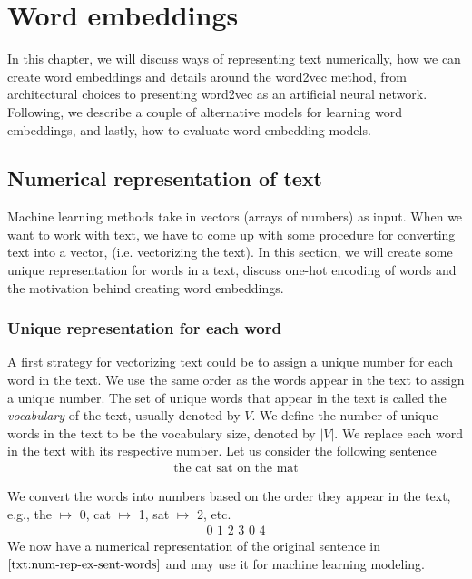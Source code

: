 \chapter{Word embeddings}
In this chapter, we will discuss ways of representing text numerically, how we can create word embeddings and details around the word2vec method, from architectural choices to presenting word2vec as an artificial neural network. Following, we describe a couple of alternative models for learning word embeddings, and lastly, how to evaluate word embedding models.

\section{Numerical representation of text}
Machine learning methods take in vectors (arrays of numbers) as input. When we want to work with text, we have to come up with some procedure for converting text into a vector, (i.e. vectorizing the text).
In this section, we will create some unique representation for words in a text, discuss one-hot encoding of words and the motivation behind creating word embeddings.

\subsection{Unique representation for each word}
\label{unique-representation-for-each-word}
A first strategy for vectorizing text could be to assign a unique number for each word in the text. We use the same order as the words appear in the text to assign a unique number. The set of unique words that appear in the text is called the \textit{vocabulary} of the text, usually denoted by $V$. We define the number of unique words in the text to be the vocabulary size, denoted by $|V|$. We replace each word in the text with its respective number. Let us consider the following sentence
\begin{align}
    \text{the cat sat on the mat} \label{txt:num-rep-ex-sent-words}
\end{align}

We convert the words into numbers based on the order they appear in the text, e.g., the $\mapsto$ 0, cat $\mapsto$ 1, sat $\mapsto$ 2, etc.
\begin{align}
    \text{0 1 2 3 0 4} \label{txt:num-rep-ex-sent}
\end{align}
We now have a numerical representation of the original sentence in $\cref{txt:num-rep-ex-sent-words}$ and may use it for machine learning modeling.

